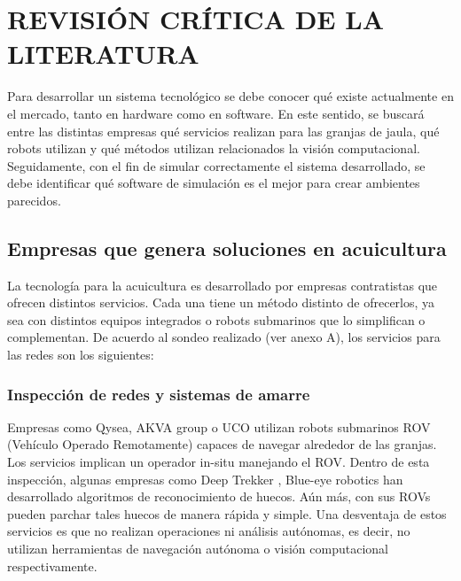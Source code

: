 \chapter{REVISIÓN CRÍTICA DE LA LITERATURA}

Para desarrollar un sistema tecnológico se debe conocer qué existe actualmente en el mercado, tanto en hardware como en software. En este sentido, se buscará entre las distintas empresas qué servicios realizan para las granjas de jaula, qué robots utilizan y qué métodos utilizan relacionados la visión computacional. Seguidamente, con el fin de simular correctamente el sistema desarrollado, se debe identificar qué software de simulación es el mejor para crear ambientes parecidos. 

\section{Empresas que genera soluciones en acuicultura}
La tecnología para la acuicultura es desarrollado por empresas contratistas que ofrecen distintos servicios. Cada una tiene un método distinto de ofrecerlos, ya sea con distintos equipos integrados o robots submarinos que lo simplifican o complementan. De acuerdo al sondeo realizado (ver anexo A), los servicios para las redes son los siguientes:

\subsection{Inspección de redes y sistemas de amarre}
Empresas como Qysea, AKVA group \cite{AKVAgroup} o UCO utilizan robots submarinos ROV (Vehículo Operado Remotamente) capaces de navegar alrededor de las granjas. Los servicios implican un operador in-situ manejando el ROV. Dentro de esta inspección, algunas empresas como Deep Trekker \cite{DeepTrekker}, Blue-eye robotics han desarrollado algoritmos de reconocimiento de huecos. Aún más, con sus ROVs pueden parchar tales huecos de manera rápida y simple. Una desventaja de estos servicios es que no realizan operaciones ni análisis autónomas, es decir, no utilizan herramientas de navegación autónoma o visión computacional respectivamente. 

